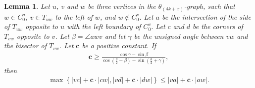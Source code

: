 \documentclass[12pt]{article}
\newtheorem{lem}[defin]{Lemma}
\newenvironment{lemma}{\begin{lem} \sl}{\end{lem}}
\newcommand{\graph}[1]{\ensuremath{\theta_{(4 k + #1)}}-graph\xspace}
\newcommand{\canon}[2]{\ensuremath{T_{#1 #2}}}
\newcommand{\const}{\ensuremath{\boldsymbol{c}}\xspace}
\begin{document}
\begin{lemma}
  \label{lem:CalculationCase}
  Let $u$, $v$ and $w$ be three vertices in the \graph{x}, such that $w \in C_0^u$, $v \in \canon{u}{w}$ to the left of $w$, and $w \not \in C_0^v$. Let $a$ be the intersection of the side of $\canon{u}{w}$ opposite to $u$ with the left boundary of $C_0^v$. Let $c$ and $d$ be the corners of $\canon{v}{w}$ opposite to $v$. Let $\beta = \angle a w v$ and let $\gamma$ be the unsigned angle between $v w$ and the bisector of \canon{v}{w}. Let \const be a positive constant. If 
  \begin{align}
  \label{ineq:CalculationCase1}
  \const \geq \frac{\cos \gamma - \sin \beta}{\cos \left( \frac{\theta}{2} - \beta \right) - \sin \left( \frac{\theta}{2} + \gamma \right)},
  \end{align}
  then 
  \begin{align}
  \label{ineq:CalculationCase2}
  \max \left\{|v c| + \const \cdot |c w|, |v d| + \const \cdot |d w|\right\} \leq |v a| + \const \cdot |a w|.
  \end{align}
\end{lemma}
\end{document}
